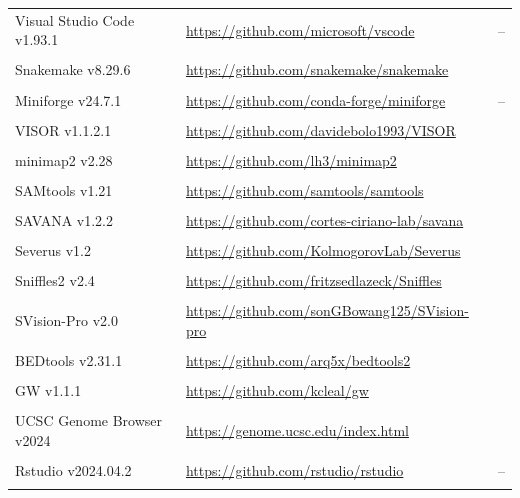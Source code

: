 \begin{longtable}{>{\RaggedRight\arraybackslash}p{3.5cm} >{\RaggedRight\arraybackslash}p{9.25cm} >{\RaggedRight\arraybackslash}p{2cm}}
\\
Visual Studio Code v1.93.1   & \url{https://github.com/microsoft/vscode}          & --                                    \\
\\
Snakemake v8.29.6            & \url{https://github.com/snakemake/snakemake}       & \cite{koster_snakemakescalable_2012}  \\
\\
Miniforge v24.7.1            & \url{https://github.com/conda-forge/miniforge}     & --                                    \\
\\
VISOR v1.1.2.1               & \url{https://github.com/davidebolo1993/VISOR}      & \cite{bolognini_visor_2020}           \\
\\
minimap2 v2.28               & \url{https://github.com/lh3/minimap2}              & \cite{li_minimap2_2018}               \\          
\\
SAMtools v1.21               & \url{https://github.com/samtools/samtools}         & \cite{danecek_twelve_2021}            \\
\\
SAVANA v1.2.2                & \url{https://github.com/cortes-ciriano-lab/savana} & \cite{elrick_savana_2024}             \\
\\
Severus v1.2                 & \url{https://github.com/KolmogorovLab/Severus}     & \cite{keskus_severus_2024}            \\
\\
Sniffles2 v2.4               & \url{https://github.com/fritzsedlazeck/Sniffles}   & \cite{smolka_detection_2024}          \\
\\
SVision-Pro v2.0             & \url{https://github.com/sonGBowang125/SVision-pro} & \cite{wang_novo_2024}                 \\
\\
BEDtools v2.31.1             & \url{https://github.com/arq5x/bedtools2}           & \cite{quinlan_bedtools_2010}          \\
\\
GW v1.1.1                    & \url{https://github.com/kcleal/gw   }              & \cite{cleal_gw_2024}                  \\
\\
UCSC Genome Browser v2024    & \url{https://genome.ucsc.edu/index.html}           & \cite{perez_ucsc_2025}                \\
\\
Rstudio v2024.04.2           & \url{https://github.com/rstudio/rstudio}           & --                                    \\      
\\

\end{longtable}
\endgroup


